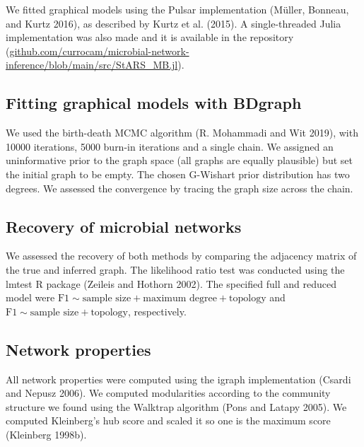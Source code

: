 \documentclass[
  a4paper,
]{article}
\begin{document}
We fitted graphical models using the Pulsar implementation (Müller,
Bonneau, and Kurtz 2016), as described by Kurtz et al. (2015). A
single-threaded Julia implementation was also made and it is available
in the repository
(\href{https://github.com/currocam/microbial-network-inference/blob/main/src/StARS_MB.jl}{github.com/currocam/microbial-network-inference/blob/main/src/StARS\_MB.jl}).

\hypertarget{fitting-graphical-models-with-bdgraph}{%
\subsection{Fitting graphical models with
BDgraph}\label{fitting-graphical-models-with-bdgraph}}

We used the birth-death MCMC algorithm (R. Mohammadi and Wit 2019), with
10000 iterations, 5000 burn-in iterations and a single chain. We
assigned an uninformative prior to the graph space (all graphs are
equally plausible) but set the initial graph to be empty. The chosen
G-Wishart prior distribution has two degrees. We assessed the
convergence by tracing the graph size across the chain.

\hypertarget{recovery-of-microbial-networks-1}{%
\subsection{Recovery of microbial
networks}\label{recovery-of-microbial-networks-1}}

We assessed the recovery of both methods by comparing the adjacency
matrix of the true and inferred graph. The likelihood ratio test was
conducted using the lmtest R package (Zeileis and Hothorn 2002). The
specified full and reduced model were
\(\text{F1} \sim \text{sample size} + \text{maximum degree} + \text{topology}\)
and \(\text{F1} \sim \text{sample size} + \text{topology}\),
respectively.

\hypertarget{network-properties}{%
\subsection{Network properties}\label{network-properties}}

All network properties were computed using the igraph implementation
(Csardi and Nepusz 2006). We computed modularities according to the
community structure we found using the Walktrap algorithm (Pons and
Latapy 2005). We computed Kleinberg's hub score and scaled it so one is
the maximum score (Kleinberg 1998b).
\end{document}
